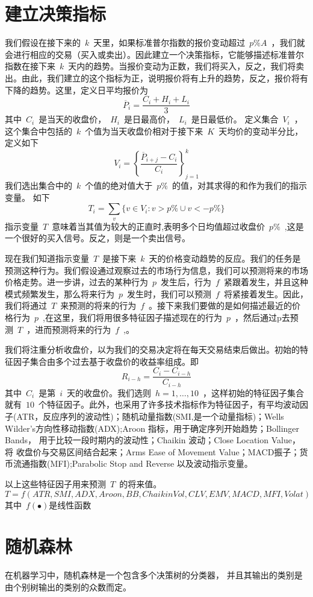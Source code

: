 \documentclass{article}\usepackage[]{graphicx}\usepackage[]{color}
\begin{document}
\begin{CJK*}{UTF8}{gkai}
\section{建立决策指标}

我们假设在接下来的~$k$~天里，如果标准普尔指数的报价变动超过~$p\%A$~，我们就会进行相应的交易（买入或卖出）。因此建立一个决策指标，它能够描述标准普尔指数在接下来~$k$~天内的趋势。当报价变动为正数，我们将买入，反之，我们将卖出。由此，我们建立的这个指标为正，说明报价将有上升的趋势，反之，报价将有下降的趋势。这里，定义日平均报价为
$$\overline{P}_i = \frac{C_i+H_i+L_i}{3}$$
其中~$C_i$~是当天的收盘价，~$H_i$~是日最高价，~$L_i$~是日最低价。
定义集合~$V_i$~，这个集合中包括的~$k$~个值为当天收盘价相对于接下来~$K$~天均价的变动半分比，定义如下
$$V_i = \left\{\frac{\overline{P}_{i+j}-C_i}{C_i}\right\}_{j=1}^k$$
我们选出集合中的~$k$~个值的绝对值大于~$p\%$~的值，对其求得的和作为我们的指示变量。
如下
$$T_i = \sum_v\{v\in V_i:v>p\%\cup v<-p\%\}$$
指示变量~$T$~意味着当其值为较大的正直时,表明多个日均值超过收盘价~$p\%$~,这是一个很好的买入信号。反之，则是一个卖出信号。

现在我们知道指示变量~$T$~是接下来~$k$~天的价格变动趋势的反应。我们的任务是预测这种行为。我们假设通过观察过去的市场行为信息，我们可以预测将来的市场价格走势。进一步讲，过去的某种行为~$p$~发生后，行为~$f$~紧跟着发生，并且这种
模式频繁发生，那么将来行为~$p$~发生时，我们可以预测~$f$~将紧接着发生。因此，我们将通过~$T$~来预测的将来的行为~$f$~。接下来我们要做的是如何描述最近的价格行为~$p$~,在这里，我们将用很多特征因子描述现在的行为~$p$~，然后通过p去预测~$T$~，进而预测将来的行为~$f$~,。

我们将注重分析收盘价，以为我们的交易决定将在每天交易结束后做出。初始的特征因子集合由多个过去基于收盘价的收益率组成。即
$$R_{i-h} = \frac{C_i-C_{i-h}}{C_{i-h}}$$
其中~$C_i$~是第~$i$~天的收盘价。我们选则~$h = 1,\dots,10$~，这样初始的特征因子集合就有~$10$~个特征因子。此外，也采用了许多技术指标作为特征因子，有平均波动因子(ATR，反应序列的波动性)；随机动量指数(SMI,是一个动量指标)；Wells Wilder’s方向性移动指数(ADX);Aroon 指标，用于确定序列开始趋势；Bollinger Bands， 用于比较一段时期内的波动性；Chaikin 波动；Close Location Value，将
收盘价与交易区间结合起来；Arms Ease of Movement Value；MACD振子；货币流通指数(MFI);Parabolic Stop and Reverse 以及波动指示变量。

以上这些特征因子用来预测~$T$~的将来值。
$$T = f(ATR,SMI,ADX,Aroon,BB,ChaikinVol,CLV,EMV,MACD,MFI,Volat)$$
其中~$f(\bullet)$是线性函数
\section{随机森林}
在机器学习中，随机森林是一个包含多个决策树的分类器， 并且其输出的类别是由个别树输出的类别的众数而定。 


\end{CJK*}
\end{document}
